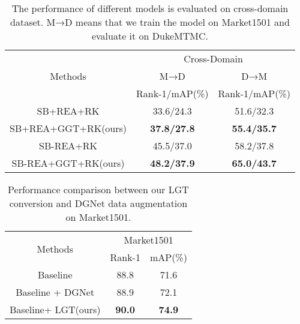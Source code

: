 \documentclass[10pt,twocolumn,letterpaper]{article}
\begin{document}
\begin{table}[]\small
\centering 
	\setlength\tabcolsep{1pt}\caption{The performance of different models is evaluated on cross-domain dataset. M→D means that we train the model on Market1501\cite{market1501} and evaluate it on DukeMTMC\cite{duke}.}
	\begin{tabular}{cclcl}
		\hline
		\multirow{3}{*}{Methods}       & \multicolumn{4}{c}{Cross-Domain}                                                \\ \cline{2-5} 
		& \multicolumn{2}{c}{M→D}  & \multicolumn{2}{c}{D→M}  \\ \cline{2-5} 
		& \multicolumn{2}{c}{Rank-1/mAP(\%)}     & \multicolumn{2}{c}{Rank-1/mAP(\%)}     \\ \hline
		SB\cite{stong_baseline}+REA\cite{zhong2020random}+RK            & \multicolumn{2}{c}{33.6/24.3}          & \multicolumn{2}{c}{51.6/32.3}          \\ 
		SB+REA+GGT+RK(ours) & \multicolumn{2}{c}{\textbf{37.8/27.8}} & \multicolumn{2}{c}{\textbf{55.4/35.7}} \\ 
		SB-REA+RK            & \multicolumn{2}{c}{45.5/37.0}          & \multicolumn{2}{c}{58.2/37.8}          \\ 
		SB-REA+GGT+RK(ours) & \multicolumn{2}{c}{\textbf{48.2/37.9}} & \multicolumn{2}{c}{\textbf{65.0/43.7}} \\ \hline
	\end{tabular}
\end{table}



\begin{table}[]
\centering 
	\setlength\tabcolsep{8pt}\caption{Performance comparison between our LGT conversion and DGNet data augmentation on Market1501.}
	\begin{tabular}{cclcl}
		\hline
		\multirow{2}{*}{Methods} & \multicolumn{4}{c}{Market1501}                                        \\ \cline{2-5} 
		& \multicolumn{2}{c}{Rank-1}        & \multicolumn{2}{c}{mAP(\%)}       \\ \hline
		Baseline\cite{zheng2018discriminatively}            & \multicolumn{2}{c}{88.8}          & \multicolumn{2}{c}{71.6}          \\ 
		Baseline + DGNet\cite{zheng2019joint}       & \multicolumn{2}{c}{{88.9}} & \multicolumn{2}{c}{{72.1}} \\ 
		Baseline+ LGT(ours) & \multicolumn{2}{c}{\textbf{90.0}} & \multicolumn{2}{c}{\textbf{74.9}} \\ \hline
	\end{tabular}
\end{table}
\end{document}
